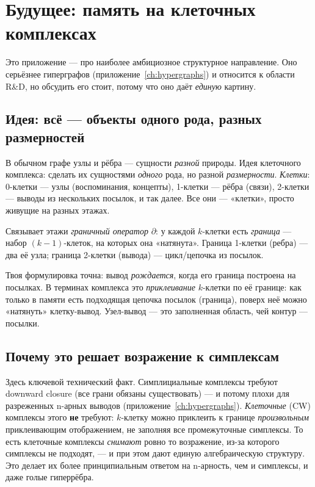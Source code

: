 \chapter{Будущее: память на клеточных комплексах}
\label{ch:cellcomplex}

Это приложение — про наиболее амбициозное структурное направление. Оно серьёзнее
гиперграфов (приложение~\ref{ch:hypergraphs}) и относится к области R\&D, но обсудить
его стоит, потому что оно даёт \emph{единую} картину.

\section{Идея: всё — объекты одного рода, разных размерностей}

В обычном графе узлы и рёбра — сущности \emph{разной} природы. Идея клеточного
комплекса: сделать их сущностями \emph{одного} рода, но разной \emph{размерности}.
\emph{Клетки}: 0-клетки — узлы (воспоминания, концепты), 1-клетки — рёбра (связи),
2-клетки — выводы из нескольких посылок, и так далее. Все они — «клетки», просто
живущие на разных этажах.

Связывает этажи \emph{граничный оператор} $\partial$: у каждой $k$-клетки есть
\emph{граница} — набор $(k{-}1)$-клеток, на которых она «натянута». Граница 1-клетки
(ребра) — два её узла; граница 2-клетки (вывода) — цикл/цепочка из посылок.

\begin{intuition}
Твоя формулировка точна: вывод \emph{рождается}, когда его граница построена на
посылках. В терминах комплекса это \emph{приклеивание} $k$-клетки по её границе:
как только в памяти есть подходящая цепочка посылок (граница), поверх неё можно
«натянуть» клетку-вывод. Узел-вывод — это заполненная область, чей контур —
посылки.
\end{intuition}

\section{Почему это решает возражение к симплексам}

Здесь ключевой технический факт. Симплициальные комплексы требуют downward closure
(все грани обязаны существовать) — и потому плохи для разреженных n-арных выводов
(приложение~\ref{ch:hypergraphs}). \emph{Клеточные} (CW) комплексы этого
\textbf{не} требуют: $k$-клетку можно приклеить к границе \emph{произвольным}
приклеивающим отображением, не заполняя все промежуточные симплексы. То есть
клеточные комплексы \emph{снимают} ровно то возражение, из-за которого симплексы не
подходят, — и при этом дают единую алгебраическую структуру. Это делает их более
принципиальным ответом на n-арность, чем и симплексы, и даже голые гиперрёбра.

